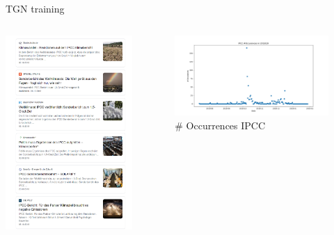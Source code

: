 \documentclass[
  8pt,
  ignorenonframetext,
  aspectratio=43,
]{beamer}
\begin{document}
\begin{frame}[fragile]{TGN training}
{  \begin{columns}[T]
  \begin{column}{0.48\textwidth}
  \includegraphics{ipcc_headlines.png}
  \end{column}

  \begin{column}{0.48\textwidth}
  \begin{figure}
  \centering
  \includegraphics{ipcc_2018.png}
  \caption{\# Occurrences IPCC}
  \end{figure}


\end{column}
\end{columns}}
\end{frame}
\end{document}
